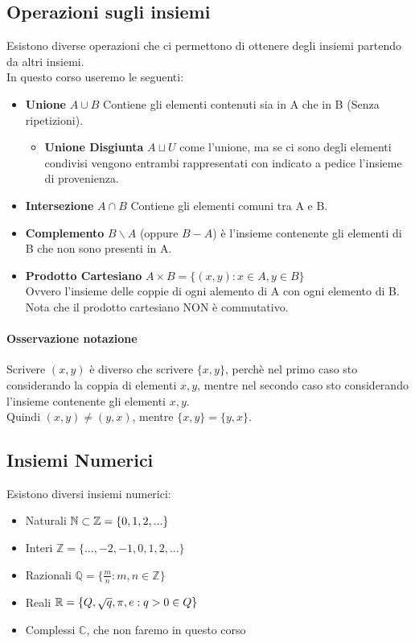     \subsection*{Operazioni sugli insiemi}
    Esistono diverse operazioni che ci permettono di ottenere degli insiemi partendo da altri insiemi.
    \\In questo corso useremo le seguenti:
    \begin{itemize}
        \item \textbf{Unione} $A \cup B$ Contiene gli elementi contenuti sia in A che in B (Senza ripetizioni).
        \begin{itemize}
            \item \textbf{Unione Disgiunta} $A \sqcup U$ come l'unione, ma se ci sono degli elementi condivisi vengono entrambi rappresentati con indicato a pedice l'insieme di provenienza. 
        \end{itemize}
        \item \textbf{Intersezione}  $A \cap B$ Contiene gli elementi comuni tra A e B.
        \item \textbf{Complemento} $B \backslash A$ (oppure $B-A$) è l'insieme contenente gli elementi di B che non sono presenti in A.
        \item \textbf{Prodotto Cartesiano} $A \times B = \{(x,y) : x\in A, y \in B\} $
        \\Ovvero l'insieme delle coppie di ogni alemento di A con ogni elemento di B. Nota che il prodotto cartesiano NON è commutativo.
    \end{itemize}
    \paragraph*{Osservazione notazione} Scrivere $(x, y)$ è diverso che scrivere $\{x, y\}$,
    perchè nel primo caso sto considerando la coppia di elementi $x, y$, mentre nel 
    secondo caso sto considerando l'insieme contenente gli elementi $x, y$.\\
    Quindi $(x, y) \neq (y, x)$, mentre $\{x, y\} = \{y, x\}$.
    \subsection*{Insiemi Numerici}
    Esistono diversi insiemi numerici:
    \begin{itemize}
        \item Naturali $\mathbb{N} \subset \mathbb{Z} = \{0,1,2,...\}$
        \item Interi $\mathbb{Z} = \{...,-2,-1,0,1,2,...\}$
        \item Razionali $\mathbb{Q} = \{\frac{m}{n}: m,n \in \mathbb{Z}\}$
        \item Reali $\mathbb{R} = \{Q,\sqrt{q}, \pi, e : q>0\in Q\}$
        \item Complessi $\mathbb{C}$, che non faremo in questo corso
    \end{itemize}
